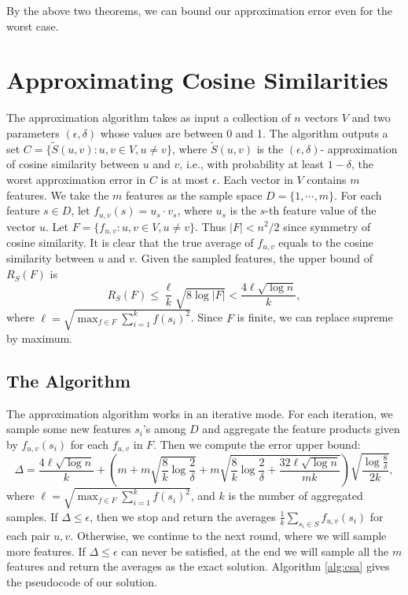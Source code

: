 \documentclass{article}
\begin{document}
By the above two theorems, we can bound our approximation error even for the worst case.


\section{Approximating Cosine Similarities}
The approximation algorithm takes as input a collection of $n$ vectors $V$ and two parameters $(\epsilon, \delta)$ whose values are between 0 and 1. The algorithm outputs a set $C = \{\tilde{S}(u,v): u,v \in V, u\not= v\}$, where $\tilde{S}(u,v)$ is the $(\epsilon, \delta)$- approximation of cosine similarity between $u$ and $v$, i.e., with probability at least $1-\delta$, the worst approximation error in $C$ is at most $\epsilon$. Each vector in $V$ contains $m$ features. We take the $m$ features as the sample space $D = \{1,\cdots,m\}$. For each feature $s\in D$, let $f_{u,v}(s) = u_s\cdot v_s$, where $u_s$ is the $s$-th feature value of the vector $u$. Let $F = \{f_{u,v}: u,v\in V, u\not= v\}$. Thus $|F| < n^2/2$ since symmetry of cosine similarity. It is clear that the true average of $f_{u,v}$ equals to the cosine similarity between $u$ and $v$. Given the sampled features, the upper bound of $R_S(F)$ is 
$$R_S(F) \leq \frac{\ell}{k}\sqrt{8\log |F|} < \frac{4\ell\sqrt{\log n}}{k},$$
where $\ell = \sqrt{\max_{f\in F} \sum_{i=1}^k f(s_i)^2}$. Since $F$ is finite, we can replace supreme by maximum. 

\subsection{The Algorithm}
The approximation algorithm works in an iterative mode. For each iteration, we sample some new features $s_i$'s among $D$ and aggregate the feature products given by $f_{u,v}(s_i)$ for each $f_{u,v}$ in $F$. Then we compute the error upper bound:
$$\Delta = \frac{4\ell\sqrt{\log n}}{k} +\left(m+m\sqrt{\frac{8}{k}\log \frac{2}{\delta}} + m\sqrt{\frac{8}{k}\log \frac{2}{\delta} + \frac{32\ell\sqrt{\log n}}{mk}}\right)\sqrt{\frac{\log \frac{8}{\delta}}{2k}},$$
where $\ell = \sqrt{\max_{f\in F} \sum_{i=1}^k f(s_i)^2}$, and $k$ is the number of aggregated samples. 
If $\Delta \leq \epsilon$, then we stop and return the averages $\frac{1}{k}\sum_{s_i\in S}f_{u,v}(s_i)$ for each pair $u, v$. Otherwise, we continue to the next round, where we will sample more features. If $\Delta \leq \epsilon$ can never be satisfied, at the end we will sample all the $m$ features and return the averages as the exact solution. Algorithm \ref{alg:csa} gives the pseudocode of our solution.
\end{document}
